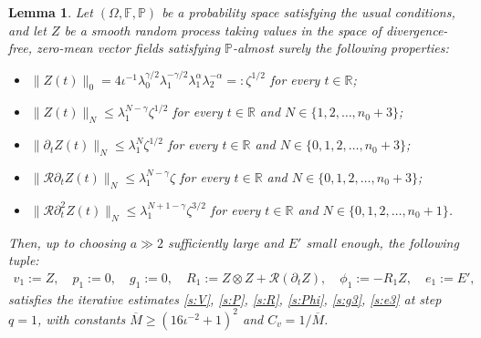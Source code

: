 \documentclass[10pt,a4paper]{amsart}
\newtheorem{lemma}{Lemma}
\newcommand{\R}{\mathbb{R}}
\begin{document}
\begin{lemma} \label{ass:Z}
Let $(\Omega,\mathbb{F},\mathbb{P})$ be a probability space satisfying the usual conditions, and let $Z$ be a smooth random process taking values in the space of divergence-free, zero-mean vector fields satisfying $\mathbb{P}$-almost surely the following properties:
\begin{itemize}
    \item $\| Z(t) \|_0 = 4\iota^{-1} \lambda_0^{\gamma/2}\lambda_1^{-\gamma/2}\lambda_1^{\alpha} \lambda_2^{-\alpha} =: \zeta^{1/2}$ for every $t \in \R$;
    \item $\| Z(t) \|_{N} \leq \lambda_1^{N-\gamma} \zeta^{1/2}$ for every $t \in \R$ and $N \in \{1,2,\dots,n_0+3\}$;
    \item $\| \partial_t Z(t) \|_{N} \leq \lambda_1^N \zeta^{1/2}$ for every $t \in \R$ and $N \in \{0,1,2,\dots,n_0+3\}$;
    \item $\| \mathcal{R}\partial_t Z(t) \|_{N} \leq \lambda_1^{N-\gamma} \zeta$ for every $t \in \R$ and $N \in \{0,1,2,\dots,n_0+3\}$;
    \item $\| \mathcal{R}\partial_t^2 Z(t) \|_{N} \leq \lambda_1^{N+1-\gamma} \zeta^{3/2}$ for every $t \in \R$ and $N \in \{0,1,2,\dots,n_0+1\}$.
\end{itemize}
Then, up to choosing $a \gg2$ sufficiently large and $E'$ small enough, the following tuple:
\begin{align}
    v_1 := Z,
    \quad
    p_1:=0,
    \quad
    g_1 := 0,
    \quad
    R_1 := Z \otimes Z + \mathcal{R}(\partial_t Z),
    \quad
    \phi _1 := -R_1 Z,
    \quad
    e_1 := E',
\end{align}
satisfies the iterative estimates \eqref{s:V}, \eqref{s:P}, \eqref{s:R}, \eqref{s:Phi}, \eqref{s:g3}, \eqref{s:e3} at step $q=1$, with constants $\overline{M} \geq (16\iota^{-2}+1)^2$ and $C_v = 1/\overline{M}$.
\end{lemma}
\end{document}
